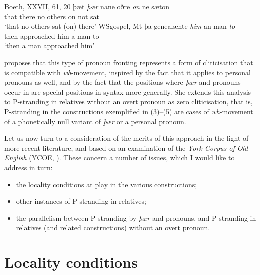 \documentclass[output=paper]{langsci/langscibook}
\begin{document}
\ea%
    \label{ex:key:11.7}
	\ea Boeth, XXVII, 61, 20
    \sn
	\gll þæt \textit{þær}   nane oðre    \textit{on} ne sæton   \\
       		that there no    others on  not sat \\
   	\glt ‘that no others sat (on) there’
	\ex WSgospel, Mt
    \sn
	\gll þa    genealæhte  \textit{him} an man \textit{to}  \\
		then approached him  a   man to\\
	\glt ‘then a man approached him’
	\z
\z

 proposes that this type of pronoun
fronting
represents a form of cliticisation that is compatible with
\textit{wh}-movement, inspired by the fact that it applies to personal pronouns
as well, and by the fact that the positions where \textit{þær} and pronouns
occur in  are special positions in  syntax more generally. She
extends this analysis to P-stranding in relatives without an overt pronoun as
zero cliticisation, that is, P-stranding in the constructions exemplified in
(3)--(5) are cases of \textit{wh}-movement of a phonetically null variant of
\textit{þær} or a personal pronoun.

Let us now turn to a consideration of the merits of this approach in the light
of more recent literature, and based on an examination of the \textit{York
Corpus of Old English} (YCOE, \citealt{Tayloretal2003}). These concern a number
of issues, which I would like to address in turn:

\begin{itemize}

    \item the locality conditions at play in the various constructions;

    \item other instances of P-stranding in
        relatives;

    \item the parallelism between P-stranding by
        \textit{þær} and pronouns, and P-stranding in
        relatives (and related constructions) without an overt pronoun.

\end{itemize}

\section{Locality conditions}
\end{document}
